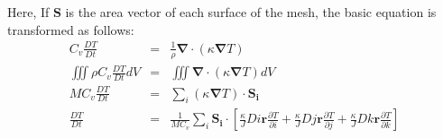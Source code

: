 \begin{enumerate}
Here,  If $\bm S$ is the area vector of each surface of the mesh, the basic equation is transformed as follows: 
	\begin{eqnarray}\label{trans2}
		C_v\frac{DT}{Dt}&=&\frac{1}{\rho}{\bm \nabla}\cdot(\kappa{\bm \nabla}T)\nonumber\\
		\iiint \rho C_v\frac{DT}{Dt}dV&=&\iiint{\bm \nabla}\cdot(\kappa{\bm \nabla}T)dV\nonumber\\
		MC_v\frac{DT}{Dt}&=&\sum_i \left(\kappa{\bm \nabla} T\right)\cdot \bm{S_i}\nonumber\\
		\frac{DT}{Dt}&=&\frac{1}{MC_v}\sum_i 	\bm{S_i} \cdot \left[\frac{\kappa}{J}Di\bm r\frac{\partial T}{\partial i}+\frac{\kappa}{J}Dj\bm r\frac{\partial T}{\partial j}+\frac{\kappa}{J}Dk\bm r\frac{\partial T}{\partial k}\right]\nonumber\\
	\end{eqnarray}
	

\end{enumerate}
